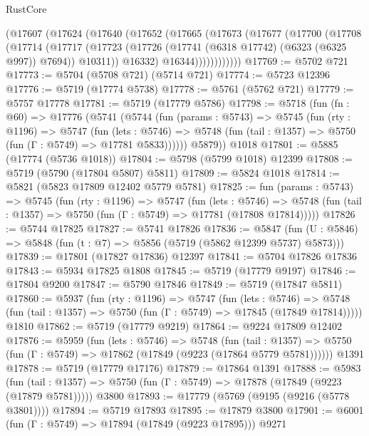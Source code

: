 \begin{lexlean}{RustCore}
\begin{coremodule}
          (@17607
            (@17624
              (@17640
                (@17652
                  (@17665
                    (@17673
                      (@17677
                        (@17700
                          (@17708
                            (@17714
                              (@17717
                                (@17723
                                  (@17726 (@17741 (@6318 @17742) (@6323 (@6325 @997)) @7694))
                                  @10311))
                              @16332)
                            @16344))))))))))))
@17769 := @5702 @721
@17773 := @5704 (@5708 @721) (@5714 @721)
@17774 := @5723 @12396
@17776 := @5719 (@17774 @5738)
@17778 := @5761 (@5762 @721)
@17779 := @5757 @17778
@17781 := @5719 (@17779 @5786)
@17798 := @5718
    (fun (fn : @60) =>
    @17776
      (@5741
        (@5744
          (fun (params : @5743) =>
          @5745
            (fun (rty : @1196) =>
            @5747
              (fun (lets : @5746) =>
              @5748 (fun (tail : @1357) => @5750 (fun (Γ : @5749) => @17781 @5833))))))
        @5879))
    @1018
@17801 := @5885 (@17774 (@5736 @1018))
@17804 := @5798 (@5799 @1018) @12399
@17808 := @5719 (@5790 (@17804 @5807) @5811)
@17809 := @5824 @1018
@17814 := @5821 (@5823 @17809 @12402 @5779 @5781)
@17825 := fun (params : @5743) =>
  @5745
    (fun (rty : @1196) =>
    @5747
      (fun (lets : @5746) =>
      @5748 (fun (tail : @1357) => @5750 (fun (Γ : @5749) => @17781 (@17808 @17814)))))
@17826 := @5744 @17825
@17827 := @5741 @17826
@17836 := @5847
    (fun (U : @5846) => @5848 (fun (t : @7) => @5856 (@5719 (@5862 @12399 @5737) @5873)))
@17839 := @17801 (@17827 @17836) @12397
@17841 := @5704 @17826 @17836
@17843 := @5934 @17825 @1808
@17845 := @5719 (@17779 @9197)
@17846 := @17804 @9200
@17847 := @5790 @17846
@17849 := @5719 (@17847 @5811)
@17860 := @5937
    (fun (rty : @1196) =>
    @5747
      (fun (lets : @5746) =>
      @5748 (fun (tail : @1357) => @5750 (fun (Γ : @5749) => @17845 (@17849 @17814)))))
    @1810
@17862 := @5719 (@17779 @9219)
@17864 := @9224 @17809 @12402
@17876 := @5959
    (fun (lets : @5746) =>
    @5748
      (fun (tail : @1357) =>
      @5750 (fun (Γ : @5749) => @17862 (@17849 (@9223 (@17864 @5779 @5781))))))
    @1391
@17878 := @5719 (@17779 @17176)
@17879 := @17864 @1391
@17888 := @5983
    (fun (tail : @1357) => @5750 (fun (Γ : @5749) => @17878 (@17849 (@9223 (@17879 @5781)))))
    @3800
@17893 := @17779 (@5769 (@9195 (@9216 (@5778 @3801))))
@17894 := @5719 @17893
@17895 := @17879 @3800
@17901 := @6001 (fun (Γ : @5749) => @17894 (@17849 (@9223 @17895))) @9271

\end{coremodule}
\end{lexlean}
